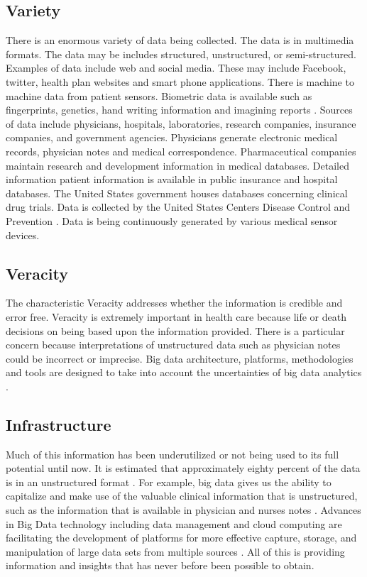 \documentclass[sigconf]{acmart}
\begin{document}
\subsection{Variety}

There is an enormous variety of data being collected. The data is in multimedia formats. The data may be includes structured, unstructured, or semi-structured. Examples of data include web and social media. These may include Facebook, twitter, health plan websites and smart phone applications. There is machine to machine data from patient sensors. Biometric data is available such as fingerprints, genetics, hand writing information and imagining reports \cite{springer}. Sources of data include physicians, hospitals, laboratories, research companies, insurance companies, and government agencies. Physicians generate electronic medical records, physician notes and medical correspondence. Pharmaceutical companies maintain research and development information in medical databases. Detailed information patient information is available in public insurance and hospital databases. The United States government houses databases concerning clinical drug trials. Data is collected by the United States Centers Disease Control and Prevention \cite{www-google-CIO}. Data is being continuously generated by various medical sensor devices. 

\subsection{Veracity}

The characteristic Veracity addresses whether the information is credible and error free. Veracity is extremely important in health care because life or death decisions on being based upon the information provided. There is a particular concern because interpretations of unstructured data such as physician notes could be incorrect or imprecise. Big data architecture, platforms, methodologies and tools are designed to take into account the uncertainties of big data analytics \cite{springer}. 

\subsection{Infrastructure}

Much of this information has been underutilized or not being used to its full potential until now. It is estimated that approximately eighty percent of the data is in an unstructured format \cite{www-google-McDonald}. For example, big data gives us the ability to capitalize and make use of the valuable clinical information that is unstructured, such as the information that is available in physician and nurses notes \cite{www-google-HlthCat}.  Advances in Big Data technology including data management and cloud computing are facilitating the development of platforms for more effective capture, storage, and manipulation of large data sets from multiple sources \cite{springer}.  All of this is providing information and insights that has never before been possible to obtain.
\end{document}
